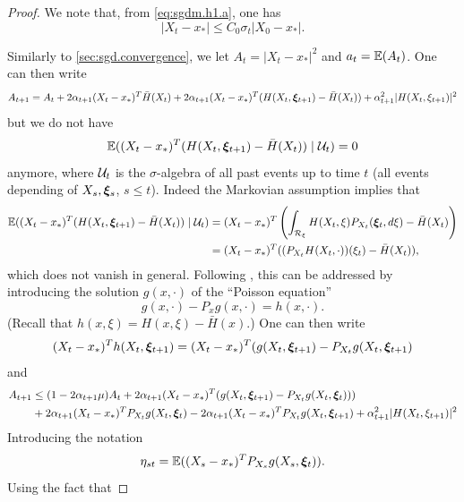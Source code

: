 \begin{proof}
We note that, from \cref{eq:sgdm.h1.a}, one has
\begin{equation}
\label{eq:sgd.prior.bound}
|X_t-x_*| \leq C_0\sigma_t  |X_0 - x_*|.
\end{equation}



Similarly to \cref{sec:sgd.convergence}, we let 
$A_t = |X_t - x_*|^2$ and $a_t = \bm{\mathbb E}(A_t)$. One can then write
\[
A_{t+1} = A_t +  2\alpha_{t+1} (X_t - x_*)^T \bar H(X_t) + 2\alpha_{t+1}  
(X_t - x_*)^T (H(X_t, {\bm{\xi}}_{t+1}) - \bar H(X_t)) + \alpha_{t+1}^2 |H(X_t, \xi_{t+1})|^2
\]
but we do not have
 \[
\bm{\mathbb E}( (X_t - x_*)^T (H(X_t, {\bm{\xi}}_{t+1}) - \bar H(X_t))\mid {\mathcal U}_t) = 0
\]
anymore, where ${\mathcal U}_t$ is the $\sigma$-algebra of all past events up to time $t$ (all events depending of $X_s, {\bm{\xi}}_s$, $s\leq t$). Indeed the Markovian assumption implies that
\begin{align*}
\bm{\mathbb E}( (X_t - x_*)^T (H(X_t, {\bm{\xi}}_{t+1}) - \bar H(X_t))\mid {\mathcal U}_t) &= 
(X_t - x_*)^T \left(\int_{{\mathcal R}_\xi} H(X_t, \xi) P_{X_t}({\bm{\xi}}_t, d\xi)  - \bar H(X_t)\right)\\
&= (X_t - x_*)^T ((P_{X_t} H(X_t, \cdot))(\xi_t) - \bar H(X_t)),
\end{align*}
which does not vanish in general. Following \citet{benveniste2012adaptive}, this can be addressed by introducing the solution $g(x, \cdot)$ of the ``Poisson equation''
\begin{equation}
\label{eq:sgd.poisson}
 g(x, \cdot) - P_x g(x, \cdot) = h(x, \cdot).
 \end{equation}
(Recall that $h(x, \xi) = H(x, \xi) - \bar H(x)$.) One can then write
 \[
 (X_t - x_*)^T h(X_t, {\bm{\xi}}_{t+1}) =  
(X_t - x_*)^T ( g(X_t, {\bm{\xi}}_{t+1}) - P_{X_t} g(X_t, {\bm{\xi}}_{t+1})\\
\]
and 
\begin{align*}
A_{t+1}  &\leq (1-2\alpha_{t+1}\mu) A_t +  2\alpha_{t+1} (X_t - x_*)^T ( g(X_t, {\bm{\xi}}_{t+1}) - P_{X_t} g(X_t, {\bm{\xi}}_{t}))) \\
&+ 2\alpha_{t+1} (X_{t} - x_*)^TP_{X_{t}} g(X_{t}, {\bm{\xi}}_{t})
 - 2\alpha_{t+1} (X_t- x_*)^TP_{X_t} g(X_t, {\bm{\xi}}_{t+1})
 +  \alpha_{t+1}^2 |H(X_t, \xi_{t+1})|^2
\end{align*}
Introducing the notation
\[
\eta_{st} = \bm{\mathbb E}((X_{s} - x_*)^TP_{X_{s}} g(X_{s}, {\bm{\xi}}_{t})).
\]
Using the fact that 

\end{proof}
